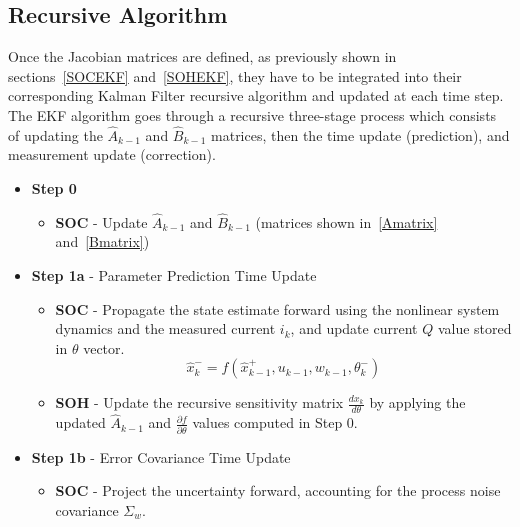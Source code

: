 \subsection{Recursive Algorithm}\label{EKFAlgorithm_Implementation}

Once the Jacobian matrices are defined, as previously shown in sections~\ref{SOCEKF} and~\ref{SOHEKF}, 
they have to be integrated into their corresponding Kalman Filter recursive algorithm and updated at each time step. 
The \acs{EKF} algorithm goes through a recursive three-stage process which consists of updating the $\hat{A}_{k-1}$ and $\hat{B}_{k-1}$ 
matrices, then the time update (prediction), and measurement update (correction).

\begin{itemize}
    \item \textbf{Step 0}
        \begin{itemize}
            \item[\(\circ\)] \textbf{\acs{SOC}} - Update $\hat{A}_{k-1}$ and $\hat{B}_{k-1}$ (matrices shown in~\eqref{Amatrix} and~\eqref{Bmatrix})
        \end{itemize}
    \item \textbf{Step 1a} - Parameter Prediction Time Update
        \begin{itemize}
            \item[\(\circ\)] \textbf{\acs{SOC}} - Propagate the state estimate forward using the nonlinear system dynamics and the measured current $i_k$,
            and update current $Q$ value stored in $\theta$ vector.
                \begin{equation}
                    \hat{x}_k^- = f(\hat{x}_{k-1}^+, u_{k-1}, w_{k-1}, \theta_k^-)
                \end{equation}
                \item[\(\circ\)] \textbf{\acs{SOH}} - Update the recursive sensitivity matrix $\frac{dx_k}{d\theta}$ by applying the updated 
                $\hat{A}_{k-1}$ and $\frac{\partial f}{\partial \theta}$ values computed in Step 0.
            \end{itemize}
    \item \textbf{Step 1b} - Error Covariance Time Update
        \begin{itemize}
            \item[\(\circ\)] \textbf{\acs{SOC}} - Project the uncertainty forward, accounting for the process noise covariance $\Sigma_w$.
            \begin{equation}

\end{equation}
\end{itemize}
\end{itemize}

